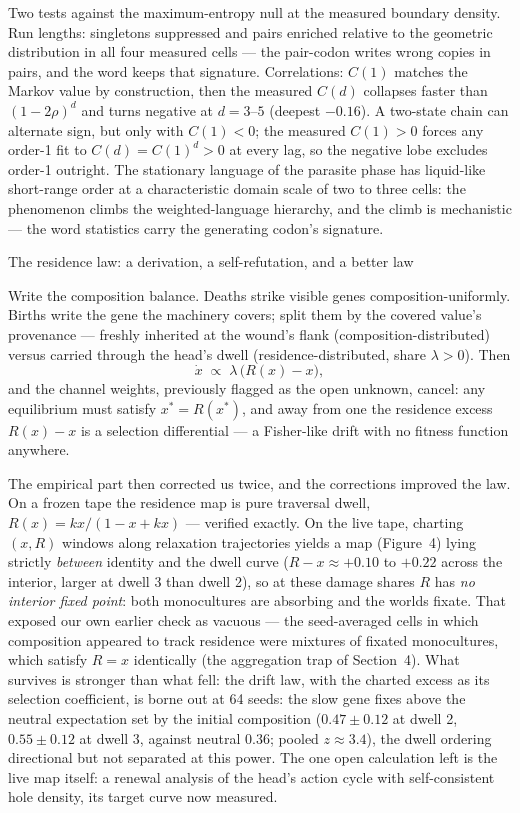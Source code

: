 Two tests against the maximum-entropy null at the measured
boundary density. Run lengths: singletons suppressed and pairs
enriched relative to the geometric distribution in all four
measured cells --- the pair-codon writes wrong copies in pairs,
and the word keeps that signature. Correlations: $C(1)$ matches
the Markov value by construction, then the measured $C(d)$
collapses faster than $(1-2\rho)^d$ and turns negative at
$d=3$--$5$ (deepest $-0.16$). A two-state chain can alternate
sign, but only with $C(1)<0$; the measured $C(1)>0$ forces any
order-1 fit to $C(d)=C(1)^d>0$ at every lag, so the negative lobe
excludes order-1 outright. The stationary
language of the parasite phase has liquid-like short-range order
at a characteristic domain scale of two to three cells: the phenomenon climbs the weighted-language hierarchy, and the
climb is mechanistic --- the word statistics carry the generating
codon's signature.

\secc The residence law: a derivation, a self-refutation, and a better law

Write the composition balance. Deaths strike visible genes
composition-uniformly. Births write the gene the machinery covers;
split them by the covered value's provenance --- freshly inherited
at the wound's flank (composition-distributed) versus carried
through the head's dwell (residence-distributed, share
$\lambda>0$). Then
$$
\dot x \;\propto\; \lambda\,\bigl(R(x)-x\bigr),
$$
and the channel weights, previously flagged as the open unknown,
cancel: any equilibrium must satisfy $x^*=R(x^*)$, and away from
one the residence excess $R(x)-x$ is a selection differential ---
a Fisher-like drift with no fitness function anywhere.

The empirical part then corrected us twice, and the corrections
improved the law. On a frozen tape the residence map is pure
traversal dwell, $R(x)=kx/(1-x+kx)$ --- verified exactly. On the
live tape, charting $(x,R)$ windows along relaxation trajectories
yields a map (Figure~4) lying strictly {\it between} identity
and the dwell curve ($R-x\approx+0.10$ to $+0.22$ across the interior, larger
at dwell 3 than dwell 2), so at these damage shares $R$ has {\it
no interior fixed point}: both monocultures are absorbing and the
worlds fixate. That exposed our own earlier check as vacuous ---
the seed-averaged cells in which composition appeared to track
residence were mixtures of fixated monocultures, which satisfy
$R=x$ identically (the aggregation trap of Section~4). What
survives is stronger than what fell: the drift law, with the
charted excess as its selection coefficient, is borne out at 64 seeds: the slow gene
fixes above the neutral expectation set by the initial composition
($0.47\pm0.12$ at dwell 2, $0.55\pm0.12$ at dwell 3, against
neutral 0.36; pooled $z\approx3.4$), the dwell ordering
directional but not separated at this power. The one open
calculation left is the live map itself: a renewal analysis of the
head's action cycle with self-consistent hole density, its target
curve now measured.

